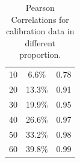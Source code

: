 \documentclass[11pt,letterpaper]{article}
\begin{document}
\begin{table}
\begin{center}
\begin{tabular}{cc|c}
10                                                & 6.6\%                                      & 0.78                                                                                                                                    \\
20                                                & 13.3\%                                     & 0.91                                                                                                                                   \\
30                                                & 19.9\%                                     & 0.95                                                                                                                                 \\
40                                                & 26.6\%                                     & 0.97                                                                                                                                 \\
50                                                & 33.2\%                                     & 0.98                                                                                                                                   \\ 
60                                                & 39.8\%                                     & 0.99                                                                                                                                    \\ \hline
\end{tabular}
\end{center}
\caption{\label{spearmansen} Pearson Correlations for calibration data in different proportion. 
}
\end{table}
\end{document}
